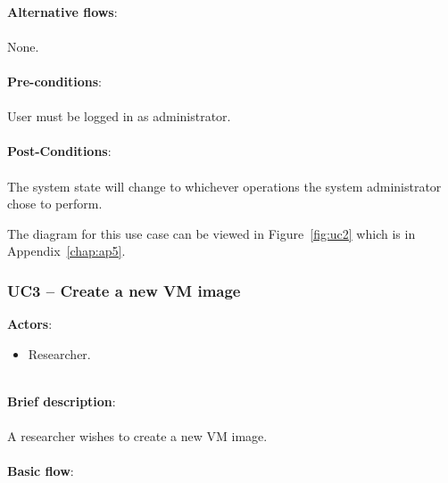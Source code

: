 \ \\
\textbf{Alternative flows}:\\
\ \\
None.\\
\ \\
\textbf{Pre-conditions}:\\
\ \\
User must be logged in as administrator.\\
\ \\
\textbf{Post-Conditions}:\\
\ \\
The system state will change to whichever operations the system administrator chose to perform.

The diagram for this use case can be viewed in Figure~\ref{fig:uc2} which is in Appendix~\ref{chap:ap5}.

\subsubsection{UC3 -- Create a new VM image}\label{uc3}

\textbf{Actors}:

\begin{itemize}
\item Researcher.
\end{itemize}

\ \\
\textbf{Brief description}:\\
\ \\
A researcher wishes to create a new VM image.\\
\ \\
\textbf{Basic flow}:

